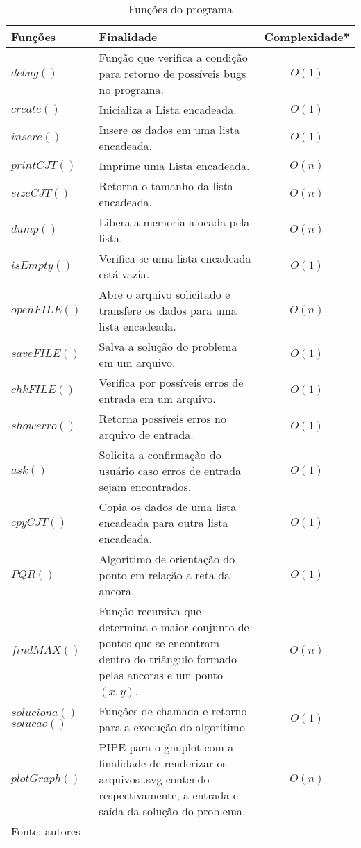 \documentclass[12pt,a4paper]{article}
\begin{document}
\begin{table}[!htbp]
	\centering
	\caption{Funções do programa}
	\renewcommand{\arraystretch}{1.5}
	\begin{tabular}{L{3cm} L{10cm} c}
		\toprule 
		Funções & Finalidade & Complexidade* \\ 
		\midrule
		$debug()$ & Função que verifica a condição para retorno de possíveis bugs no programa. & $O(1)$ \\
		$create()$ & Inicializa a Lista encadeada. & $O(1)$ \\
		$insere()$ & Insere os dados em uma lista encadeada. & $O(1)$ \\
		$printCJT()$ & Imprime uma Lista encadeada. & $O(n)$ \\
		$sizeCJT()$ & Retorna o tamanho da lista encadeada. & $O(n)$ \\
		$dump()$ & Libera a memoria alocada pela lista. & $O(n)$ \\
		$isEmpty()$ & Verifica se uma lista encadeada está vazia. & $O(1)$ \\
		$openFILE()$ & Abre o arquivo solicitado e transfere os dados para uma lista encadeada. & $O(n)$ \\
		$saveFILE()$ & Salva a solução do problema em um arquivo. & $O(1)$ \\
		$chkFILE()$ & Verifica por possíveis erros de entrada em um arquivo. & $O(1)$ \\
		$showerro()$ & Retorna possíveis erros no arquivo de entrada. & $O(1)$ \\
		$ask()$ & Solicita a confirmação do usuário caso erros de entrada sejam encontrados. & $O(1)$ \\
		$cpyCJT()$ & Copia os dados de uma lista encadeada para outra lista encadeada. & $O(1)$ \\
		$PQR()$ & Algorítimo de orientação do ponto em relação a reta da ancora. & $O(1)$ \\
		$findMAX()$ & Função recursiva que determina o maior conjunto de pontos que se encontram dentro do triângulo formado pelas ancoras e um ponto $(x,y)$.  & $O(n)$ \\
		$soluciona()$ \newline $solucao()$ & Funções de chamada e retorno para a execução do algorítimo & $O(1)$ \\
		$plotGraph()$ & PIPE para o gnuplot com a finalidade de renderizar os arquivos .svg contendo respectivamente, a entrada e saída da solução do problema.  & $O(n)$ \\ 
		\bottomrule
		\footnotesize Fonte: autores
	\end{tabular}
\end{table}
\end{document}
